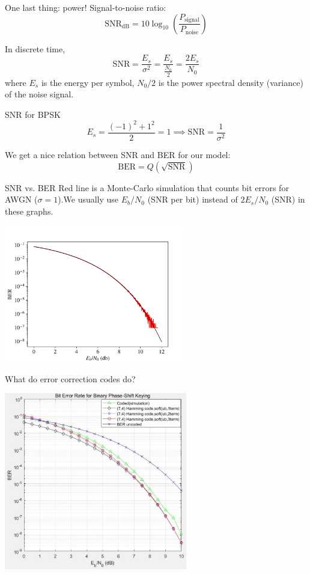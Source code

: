 \documentclass[aspectratio=1610, 10pt]{beamer}
\begin{document}
\begin{frame}[label={sec:org69ff48d}]{One last thing: power!}
Signal-to-noise ratio:
$$\mathrm{SNR_{dB}} = 10\log_{10}{\left(\frac{P_{\text{signal}}}{P_{\text{noise}}} \right)}$$

In discrete time,
$$\text{SNR} = \frac{E_s}{\sigma^2} = \frac{E_s}{\frac{N_0}{2}} = \frac{2E_s}{N_0}$$
where \(E_s\) is the energy per symbol, \(N_0/2\) is the power spectral
density (variance) of the noise signal.
\end{frame}

\begin{frame}[label={sec:orgb4d8724}]{SNR for BPSK}
$$E_s = \frac{(-1)^2 + 1^2}{2} = 1\implies \text{SNR} =
\frac{1}{\sigma^2}$$

We get a nice relation between SNR and BER for our model:
$$\text{BER} = Q\left(\sqrt{\text{SNR}}\right)$$
\end{frame}

\begin{frame}[label={sec:org2489d81}]{SNR vs. BER}
Red line is a Monte-Carlo simulation that counts bit errors for AWGN
(\(\sigma = 1\)).We usually use \(E_b/N_0\) (SNR per bit) instead of
\(2E_s/N_0\) (SNR) in these graphs.
\begin{center}
\includegraphics[width=0.6\textwidth]{./snr_ber_plot.png}
\end{center}
\end{frame}

\begin{frame}[label={sec:org3610f89}]{What do error correction codes do?}
\begin{center}
\includegraphics[width=0.6\textwidth]{./error_correction_ber_snr.jpeg}
\end{center}
\end{frame}
\end{document}
